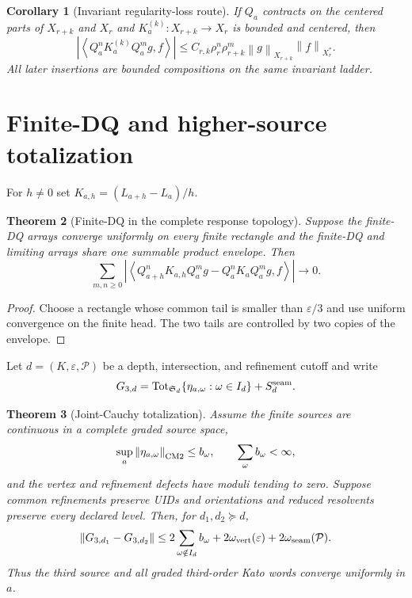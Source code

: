 \documentclass[11pt,reqno]{amsart}
\newtheorem{theorem}{Theorem}[section]
\newtheorem{corollary}[theorem]{Corollary}
\theoremstyle{definition}
\theoremstyle{remark}
\newcommand{\Tot}{\operatorname{Tot}}
\newcommand{\norm}[1]{\left\lVert #1\right\rVert}
\newcommand{\abs}[1]{\left\lvert #1\right\rvert}
\newcommand{\pair}[2]{\left\langle #1,#2\right\rangle}
\begin{document}
\begin{corollary}[Invariant regularity-loss route]\label{cor:loss}
If $Q_a$ contracts on the centered parts of $X_{r+k}$ and $X_r$ and
$K_a^{(k)}:X_{r+k}\to X_r$ is bounded and centered, then
\[
 \abs{\pair{Q_a^nK_a^{(k)}Q_a^m g}{f}}
 \le C_{r,k}\rho_r^n\rho_{r+k}^m
 \norm g_{X_{r+k}}\norm f_{X_r^*}.
\]
All later insertions are bounded compositions on the same invariant ladder.
\end{corollary}

\section{Finite-DQ and higher-source totalization}\label{sec:higher}
For $h\ne0$ set $K_{a,h}=(L_{a+h}-L_a)/h$.

\begin{theorem}[Finite-DQ in the complete response topology]\label{thm:fdq}
Suppose the finite-DQ arrays converge uniformly on every finite rectangle and
the finite-DQ and limiting arrays share one summable product envelope.  Then
\[
 \sum_{m,n\ge0}
 \abs{\pair{Q_{a+h}^nK_{a,h}Q_a^mg-Q_a^nK_aQ_a^mg}{f}}
 \longrightarrow0.
\]
\end{theorem}

\begin{proof}
Choose a rectangle whose common tail is smaller than $\varepsilon/3$ and use
uniform convergence on the finite head.  The two tails are controlled by two
copies of the envelope.
\end{proof}

Let $d=(K,\varepsilon,\mathcal P)$ be a depth, intersection, and refinement
cutoff and write
\[
 G_{3,d}=
 \Tot_{\mathfrak S_d}\{\eta_{a,\omega}:\omega\in I_d\}
 +S_d^{\rm seam}.
\]

\begin{theorem}[Joint-Cauchy totalization]\label{thm:totalization}
Assume the finite sources are continuous in a complete graded source space,
\[
 \sup_a\norm{\eta_{a,\omega}}_{\rm CM2}\le b_\omega,
 \qquad\sum_\omega b_\omega<\infty,
\]
and the vertex and refinement defects have moduli tending to zero.  Suppose
common refinements preserve UIDs and orientations and reduced resolvents
preserve every declared level.  Then, for $d_1,d_2\succeq d$,
\[
 \norm{G_{3,d_1}-G_{3,d_2}}
 \le2\sum_{\omega\notin I_d}b_\omega
 +2\omega_{\rm vert}(\varepsilon)
 +2\omega_{\rm seam}(\mathcal P).
\]
Thus the third source and all graded third-order Kato words converge uniformly
in $a$.
\end{theorem}
\end{document}
